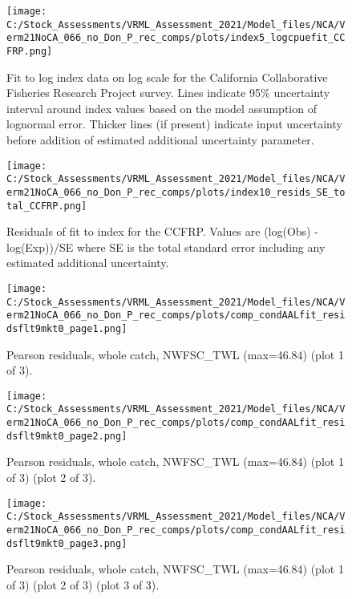 \documentclass[11pt,
  english,
  a4paper,
]{article}
\begin{document}
\begin{figure}
\centering
\texttt{[image: C:/Stock\_Assessments/VRML\_Assessment\_2021/Model\_files/NCA/Verm21NoCA\_066\_no\_Don\_P\_rec\_comps/plots/index5\_logcpuefit\_CCFRP.png]}
\caption{Fit to log index data on log scale for the California Collaborative Fisheries Research Project survey. Lines indicate 95\% uncertainty interval around index values based on the model assumption of lognormal error. Thicker lines (if present) indicate input uncertainty before addition of estimated additional uncertainty parameter.\label{fig:log-cpue-CCFRP}}
\end{figure}

\begin{figure}
\centering
\texttt{[image: C:/Stock\_Assessments/VRML\_Assessment\_2021/Model\_files/NCA/Verm21NoCA\_066\_no\_Don\_P\_rec\_comps/plots/index10\_resids\_SE\_total\_CCFRP.png]}
\caption{Residuals of fit to index for the CCFRP. Values are (log(Obs) - log(Exp))/SE where SE is the total standard error including any estimated additional uncertainty.\label{fig:cpue-resid-CCFRP}}
\end{figure}

\begin{figure}
\centering
\texttt{[image: C:/Stock\_Assessments/VRML\_Assessment\_2021/Model\_files/NCA/Verm21NoCA\_066\_no\_Don\_P\_rec\_comps/plots/comp\_condAALfit\_residsflt9mkt0\_page1.png]}
\caption{Pearson residuals, whole catch, NWFSC\_TWL (max=46.84) (plot 1 of 3).\label{fig:comp_condAALfit_residsflt9mkt0_page1}}
\end{figure}

\begin{figure}
\centering
\texttt{[image: C:/Stock\_Assessments/VRML\_Assessment\_2021/Model\_files/NCA/Verm21NoCA\_066\_no\_Don\_P\_rec\_comps/plots/comp\_condAALfit\_residsflt9mkt0\_page2.png]}
\caption{Pearson residuals, whole catch, NWFSC\_TWL (max=46.84) (plot 1 of 3) (plot 2 of 3).\label{fig:comp_condAALfit_residsflt9mkt0_page2}}
\end{figure}

\begin{figure}
\centering
\texttt{[image: C:/Stock\_Assessments/VRML\_Assessment\_2021/Model\_files/NCA/Verm21NoCA\_066\_no\_Don\_P\_rec\_comps/plots/comp\_condAALfit\_residsflt9mkt0\_page3.png]}
\caption{Pearson residuals, whole catch, NWFSC\_TWL (max=46.84) (plot 1 of 3) (plot 2 of 3) (plot 3 of 3).\label{fig:comp_condAALfit_residsflt9mkt0_page3}}
\end{figure}
\end{document}
